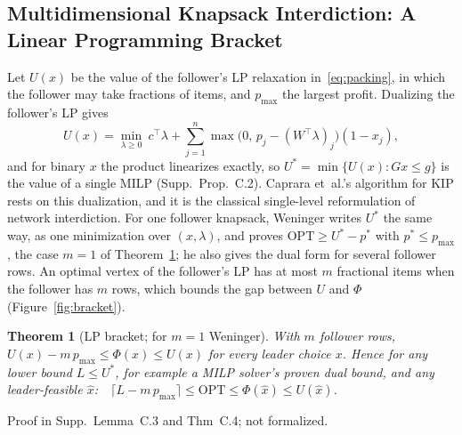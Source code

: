 \documentclass[]{spie}  %
\theoremstyle{plain}
\newtheorem{thm}{Theorem}
\newcommand{\OPT}{\mathrm{OPT}}
\newcommand{\pmax}{p_{\max}}
\newcommand{\T}{^{\top}}
\begin{document}
\subsection{Multidimensional Knapsack Interdiction: A Linear Programming Bracket}\label{sec:mkip}

Let $U(x)$ be the value of the follower's LP relaxation in~\eqref{eq:packing},
in which the follower may take fractions of items, and $\pmax$ the largest profit. Dualizing the
follower's LP gives
\[
U(x)=\min_{\lambda\ge 0}\ c\T\lambda+\sum_{j=1}^n\max\bigl(0,\,p_j-(W\T\lambda)_j\bigr)(1-x_j),
\]
and for binary $x$ the product linearizes exactly, so $U^*=\min\{U(x): Gx\le g\}$ is the value of
a single MILP (Supp.\ Prop.~C.2). Caprara et~al.'s algorithm for KIP rests on this
dualization,\cite{caprara2016bilevel,dellacroce2020exact} and it is the classical single-level
reformulation of network interdiction.\cite{wood1993deterministic,israeli2002shortest} For one
follower knapsack, Weninger writes $U^*$ the same way, as one minimization over $(x,\lambda)$, and
proves $\OPT\ge U^*-p^*$ with $p^*\le\pmax$, the case $m=1$ of Theorem~\ref{thm:bracket}; he also
gives the dual form for several follower rows.\cite{weninger2026approx} An optimal
vertex of the follower's LP has at most $m$ fractional items when the follower has $m$ rows, which
bounds the gap between $U$ and $\Phi$ (Figure~\ref{fig:bracket}).

\begin{thm}[LP bracket; for $m=1$ Weninger\cite{weninger2026approx}]\label{thm:bracket}
With $m$ follower rows, $U(x)-m\,\pmax\le\Phi(x)\le U(x)$ for every leader choice $x$. Hence for
any lower bound $L\le U^*$, for example a MILP solver's proven dual bound, and any leader-feasible
$\hat x$:\ \ $\lceil L-m\,\pmax\rceil\le\OPT\le\Phi(\hat x)\le U(\hat x)$.
\end{thm}
\noindent Proof in Supp.\ Lemma~C.3 and Thm~C.4; not formalized.
\end{document}
